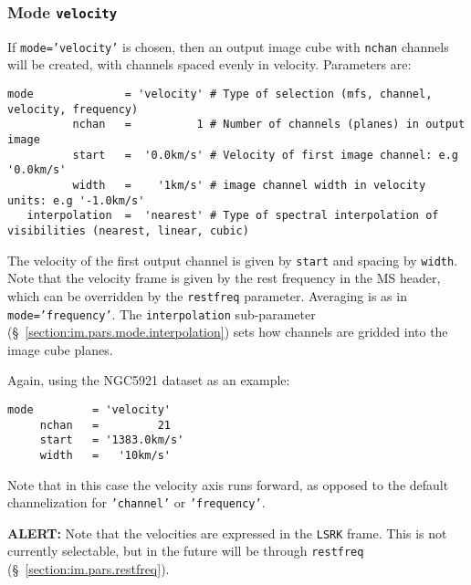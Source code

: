 \subsubsection{Mode {\tt velocity} }
\label{section:im.pars.mode.velocity}

If {\tt mode='velocity'} is chosen, then an output image cube
with {\tt nchan} channels will be created, with channels spaced
evenly in velocity.  Parameters are:
\small
\begin{verbatim}
mode              = 'velocity' # Type of selection (mfs, channel, velocity, frequency)
          nchan   =          1 # Number of channels (planes) in output image
          start   =  '0.0km/s' # Velocity of first image channel: e.g '0.0km/s'
          width   =    '1km/s' # image channel width in velocity units: e.g '-1.0km/s'
   interpolation  =  'nearest' # Type of spectral interpolation of visibilities (nearest, linear, cubic)
\end{verbatim}
\normalsize
The velocity of the first output channel is given by {\tt start}
and spacing by {\tt width}.  Note that the velocity frame is given
by the rest frequency in the MS header, which can be overridden
by the {\tt restfreq} parameter.  Averaging is as in
{\tt mode='frequency'}.  The {\tt interpolation} sub-parameter
(\S~\ref{section:im.pars.mode.interpolation}) sets how channels are
gridded into the image cube planes.

Again, using the NGC5921 dataset as an example:
\small
\begin{verbatim}
mode         = 'velocity'        
     nchan   =         21        
     start   = '1383.0km/s'      
     width   =   '10km/s'        
\end{verbatim}
\normalsize
Note that in this case the velocity axis runs forward, as opposed to
the default channelization for {\tt 'channel'} or {\tt 'frequency'}.

{\bf ALERT:} Note that the velocities are expressed in the 
{\tt LSRK} frame.  This is not currently selectable, but in the
future will be through {\tt restfreq} (\S~\ref{section:im.pars.restfreq}).


